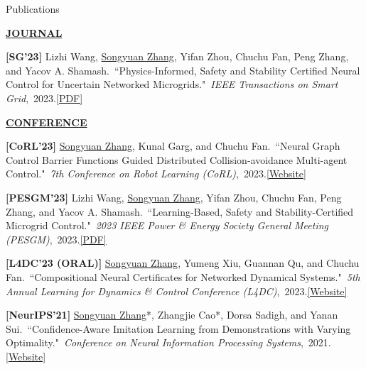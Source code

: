 \documentclass{resume} %
\newcommand{\paperItem}[4]{#1.~``#2."~\textit{#3},~#4.}%
\newcommand{\me}{\underline{Songyuan Zhang}}
\newcommand{\meshort}{\textbf{S. Zhang}}
\newcommand{\person}[2]{#1}
\begin{document}
	\begin{rSection}{Publications}
		\item[] \textbf{\underline{JOURNAL}}
		\vspace{5pt}
		{
			\item {\bf [SG'23]}
			\paperItem{\person{Lizhi Wang}{L. Wang}, \person{\me}{\meshort}, \person{Yifan Zhou}{Y. Zhou}, \person{Chuchu Fan}{C. Fan}, \person{Peng Zhang}{P. Zhang}, and \person{Yacov A. Shamash}{YA. Shamash}}{Physics-Informed, Safety and Stability Certified Neural Control for Uncertain Networked Microgrids}{IEEE Transactions on Smart Grid}{2023}{\href{https://ieeexplore.ieee.org/stamp/stamp.jsp?arnumber=10233047}{[PDF]}}
		}
		\vspace{5pt}
		\item[] \textbf{\underline{CONFERENCE}}
		\vspace{5pt}
		{
			\item {\bf [CoRL'23]}
			\paperItem{\person{\me}{\meshort}, \person{Kunal Garg}{K. Garg}, and \person{Chuchu Fan}{C. Fan}}{Neural Graph Control Barrier Functions Guided Distributed Collision-avoidance Multi-agent Control}{7th Conference on Robot Learning (CoRL)}{2023}{\href{https://mit-realm.github.io/gcbf-website/}{[Website]}}
			\item {\bf [PESGM'23]}
			\paperItem{\person{Lizhi Wang}{L. Wang}, \person{\me}{\meshort}, \person{Yifan Zhou}{Y. Zhou}, \person{Chuchu Fan}{C. Fan}, \person{Peng Zhang}{P. Zhang}, and \person{Yacov A. Shamash}{YA. Shamash}}{Learning-Based, Safety and Stability-Certified Microgrid Control}{2023 IEEE Power \& Energy Society General Meeting (PESGM)}{2023}{\href{https://ieeexplore.ieee.org/stamp/stamp.jsp?arnumber=10253396}{[PDF]}}
			\item {\bf [L4DC'23 (ORAL)]}
			\paperItem{\person{\me}{\meshort}, \person{Yumeng Xiu}{Y. Xiu}, \person{Guannan Qu}{G. Qu}, and \person{Chuchu Fan}{C. Fan}}{Compositional Neural Certificates for Networked Dynamical Systems}{5th Annual Learning for Dynamics \& Control Conference (L4DC)}{2023}{\href{https://mit-realm.github.io/neuriss-website/}{[Website]}}
			\item {\bf [NeurIPS'21]}
			\paperItem{\person{\me*}{\meshort}, \person{Zhangjie Cao*}{Z. Cao}, \person{Dorsa Sadigh}{D. Sadigh}, and \person{Yanan Sui}{Y. Sui}}{Confidence-Aware Imitation Learning from Demonstrations with Varying Optimality}{Conference on Neural Information Processing Systems}{2021}{\href{https://sites.google.com/view/cail/}{[Website]}}
		}
	\end{rSection}
\end{document}
